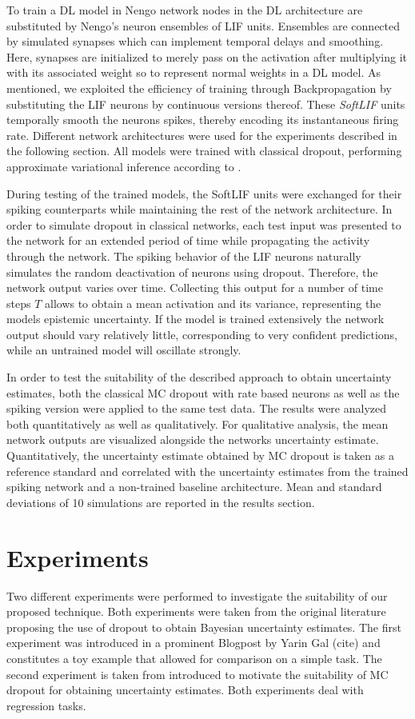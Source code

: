 \documentclass[10pt,a4paper,twocolumn]{article}
\begin{document}
To train a DL model in Nengo network nodes in the DL architecture are substituted by Nengo's neuron ensembles of LIF units. Ensembles are connected by simulated synapses which can implement temporal delays and smoothing. Here, synapses are initialized to merely pass on the activation after multiplying it with its associated weight so to represent normal weights in a DL model. As mentioned, we exploited the efficiency of training through Backpropagation by substituting the LIF neurons by continuous versions thereof. These \emph{SoftLIF} units temporally smooth the neurons spikes, thereby encoding its instantaneous firing rate. Different network architectures were used for the experiments described in the following section. All models were trained with classical dropout, performing approximate variational inference according to \cite{gal2016dropout}.

During testing of the trained models, the SoftLIF units were exchanged for their spiking counterparts while maintaining the rest of the network architecture. In order to simulate dropout in classical networks, each test input was presented to the network for an extended period of time while propagating the activity through the network. The spiking behavior of the LIF neurons naturally simulates the random deactivation of neurons using dropout. Therefore, the network output varies over time. Collecting this output for a number of time steps $T$ allows to obtain a mean activation and its variance, representing the models epistemic uncertainty. If the model is trained extensively the network output should vary relatively little, corresponding to very confident predictions, while an untrained model will oscillate strongly. 

In order to test the suitability of the described approach to obtain uncertainty estimates, both the classical MC dropout with rate based neurons as well as the spiking version were applied to the same test data. The results were analyzed both quantitatively as well as qualitatively. For qualitative analysis, the mean network outputs are visualized alongside the networks uncertainty estimate. Quantitatively, the uncertainty estimate obtained by MC dropout is taken as a reference standard and correlated with the uncertainty estimates from the trained spiking network and a non-trained baseline architecture. Mean and standard deviations of 10 simulations are reported in the results section.   

\section{Experiments}
Two different experiments were performed to investigate the suitability of our proposed technique. Both experiments were taken from the original literature proposing the use of dropout to obtain Bayesian uncertainty estimates. The first experiment was introduced in a prominent Blogpost by Yarin Gal (cite) and constitutes a toy example that allowed for comparison on a simple task. The second experiment is taken from \cite{gal2016dropout} introduced to motivate the suitability of MC dropout for obtaining uncertainty estimates. Both experiments deal with regression tasks. 
\end{document}
